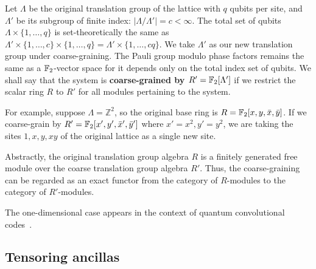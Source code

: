 Let $\Lambda$ be the original translation group of the lattice with $q$ qubits per site,
and $\Lambda'$ be its subgroup of finite index: $|\Lambda/\Lambda'| = c < \infty$.
The total set of qubits $\Lambda \times \{1,\ldots,q\}$ is set-theoretically the same as
$\Lambda' \times \{ 1, \ldots, c \} \times \{1,\ldots,q\} = \Lambda' \times \{ 1, \ldots, cq\}$.
We take $\Lambda'$ as our new translation group under coarse-graining.
The Pauli group modulo phase factors remains the same as a $\mathbb{F}_2$-vector space
for it depends only on the total index set of qubits.
We shall say that the system is {\bf coarse-grained by $R'=\mathbb{F}_2[\Lambda']$}
if we restrict the scalar ring $R$ to $R'$ for all modules pertaining to the system.

For example, suppose $\Lambda = \mathbb{Z}^2$,
so the original base ring is $R = \mathbb{F}_2[x,y,\bar x,\bar y]$.
If we coarse-grain by $R' = \mathbb{F}_2[x',y', \bar x', \bar y']$ where $x' = x^2, y' = y^2$,
we are taking the sites $1,x,y,xy$ of the original lattice as a single new site.

Abstractly, the original translation group algebra $R$ is a finitely generated free module
over the coarse translation group algebra $R'$.
Thus, the coarse-graining can be regarded as an exact functor from the category of $R$-modules
to the category of $R'$-modules.

The one-dimensional case appears in the context of 
quantum convolutional codes~\cite{WildeBrun2010Convolutional}.

\subsection{Tensoring ancillas}

